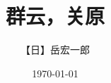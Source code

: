 
\usepackage{wallpaper}
\title{群云，关原}
\author{【日】岳宏一郎}
\date{\today}
\maketitle
\usepackage{chngcntr}
